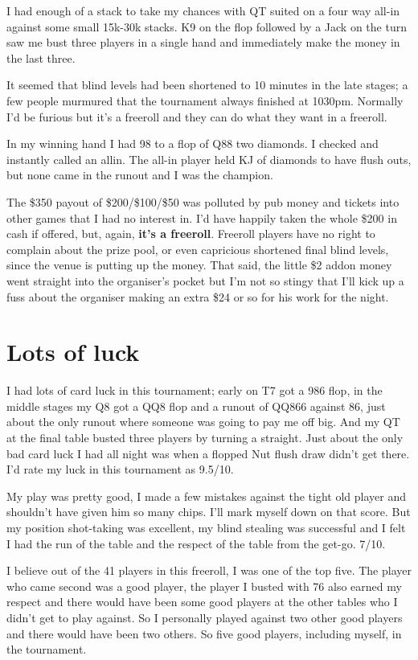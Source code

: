 I had enough of a stack to take my chances with QT suited on a
four way all-in against some small 15k-30k stacks. K9 on the flop
followed by a Jack on the turn saw me bust three players in
a single hand and immediately make the money in the last three.

It seemed that blind levels had been shortened to 10 minutes in
the late stages; a few people murmured that the tournament
always finished at 1030pm. Normally I'd be furious but it's
a freeroll and they can do what they want in a freeroll.

In my winning hand I had 98 to a flop of Q88 two diamonds.
I checked and instantly called an allin. The all-in player held
KJ of diamonds to have flush outs, but none came in the runout
and I was the champion.

The \$350 payout of \$200/\$100/\$50 was polluted by
pub money and tickets into other games that I had no
interest in. I'd have happily taken the whole
\$200 in cash if offered, but, again, \textbf{it's a freeroll}.
Freeroll players have no right to complain about the prize pool,
or even capricious shortened final blind levels, since the
venue is putting up the money. That said, the little \$2 addon
money went straight into the organiser's pocket but I'm not
so stingy that I'll kick up a fuss about the organiser making an extra \$24
or so for his work for the night.

\section{Lots of luck}

I had lots of card luck in this tournament; early on T7 got a 986 flop,
in the middle stages my Q8 got a QQ8 flop and a runout of QQ866 against
86, just about the only runout where someone was going to pay me off big.
And my QT at the final table busted three players by turning a straight.
Just about the only bad card luck I had all night was when a flopped
Nut flush draw didn't get there. I'd rate my luck in this tournament
as 9.5/10.

My play was pretty good, I made a few mistakes against the tight old
player and shouldn't have given him so many chips. I'll mark myself
down on that score. But my position shot-taking was excellent, my blind
stealing was successful and I felt I had the run of the table and
the respect of the table from the get-go. 7/10.

I believe out of the 41 players in this freeroll, I was one of
the top five. The player who came second was a good player, the player
I busted with 76 also earned my respect and there would have been
some good players at the other tables who I didn't get to play
against. So I personally played against two other good players
and there would have been two others. So five good players,
including myself, in the tournament.

